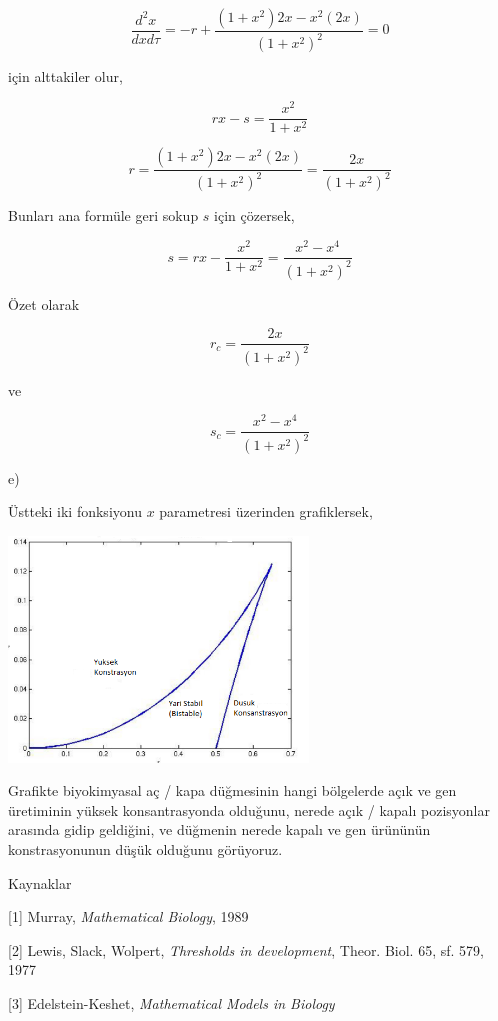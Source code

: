 \documentclass[12pt,fleqn]{article}\usepackage{../../common}
\begin{document}
$$ \frac{d^2x}{dxd\tau} = - r + \frac{(1+x^2)2x-x^2(2x)}{(1+x^2)^2} = 0$$

için alttakiler olur,

$$ rx - s = \frac{x^2}{1+x^2} $$

$$ r = \frac{(1+x^2)2x-x^2(2x)}{(1+x^2)^2} = \frac{2x}{(1+x^2)^2}$$

Bunları ana formüle geri sokup $s$ için çözersek,

$$ s = rx - \frac{x^2}{1+x^2} = \frac{x^2-x^4}{(1+x^2)^2} $$

Özet olarak

$$ r_c = \frac{2x}{(1+x^2)^2} $$

ve

$$ s_c = \frac{x^2-x^4}{(1+x^2)^2} $$

e)

Üstteki iki fonksiyonu $x$ parametresi üzerinden grafiklersek,

\includegraphics[height=6cm]{08_10.png}

Grafikte biyokimyasal aç / kapa düğmesinin hangi bölgelerde açık ve gen
üretiminin yüksek konsantrasyonda olduğunu, nerede açık / kapalı pozisyonlar
arasında gidip geldiğini, ve düğmenin nerede kapalı ve gen ürününün
konstrasyonunun düşük olduğunu görüyoruz. 

Kaynaklar

[1] Murray, {\em Mathematical Biology}, 1989

[2] Lewis, Slack, Wolpert, {\em Thresholds in development}, Theor. Biol. 65,
sf. 579, 1977

[3] Edelstein-Keshet, {\em Mathematical Models in Biology}
\end{document}
